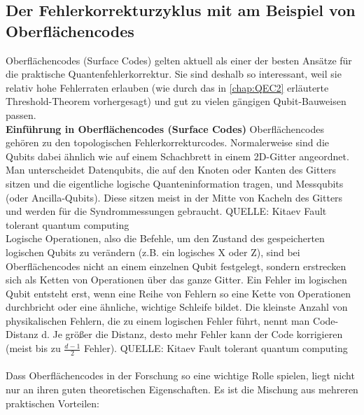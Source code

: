 \subsection{Der Fehlerkorrekturzyklus mit am Beispiel von Oberflächencodes}

Oberflächencodes (Surface Codes) gelten aktuell als einer der besten Ansätze für die praktische Quantenfehlerkorrektur. Sie sind deshalb so interessant, weil sie relativ hohe Fehlerraten erlauben (wie durch das in \ref{chap:QEC2} erläuterte Threshold-Theorem vorhergesagt) und gut zu vielen gängigen Qubit-Bauweisen passen.\\

\textbf{Einführung in Oberflächencodes (Surface Codes)}
Oberflächencodes gehören zu den topologischen Fehlerkorrekturcodes. Normalerweise sind die Qubits dabei ähnlich wie auf einem Schachbrett in einem 2D-Gitter angeordnet. Man unterscheidet Datenqubits, die auf den Knoten oder Kanten des Gitters sitzen und die eigentliche logische Quanteninformation tragen, und Messqubits (oder Ancilla-Qubits). Diese sitzen meist in der Mitte von Kacheln des Gitters und werden für die Syndrommessungen gebraucht.\cite{fowler_surface_2012} QUELLE: Kitaev Fault tolerant quantum computing
\\
Logische Operationen, also die Befehle, um den Zustand des gespeicherten logischen Qubits zu verändern (z.B. ein logisches X oder Z), sind bei Oberflächencodes nicht an einem einzelnen Qubit festgelegt, sondern erstrecken sich als Ketten von Operationen über das ganze Gitter. Ein Fehler im logischen Qubit entsteht erst, wenn eine Reihe von Fehlern so eine Kette von Operationen durchbricht oder eine ähnliche, wichtige Schleife bildet. Die kleinste Anzahl von physikalischen Fehlern, die zu einem logischen Fehler führt, nennt man Code-Distanz d. Je größer die Distanz, desto mehr Fehler kann der Code korrigieren (meist bis zu $\frac{d-1}{2}$ Fehler).\cite{fowler_surface_2012} QUELLE: Kitaev Fault tolerant quantum computing
\\\\
Dass Oberflächencodes in der Forschung so eine wichtige Rolle spielen, liegt nicht nur an ihren guten theoretischen Eigenschaften. Es ist die Mischung aus mehreren praktischen Vorteilen:

